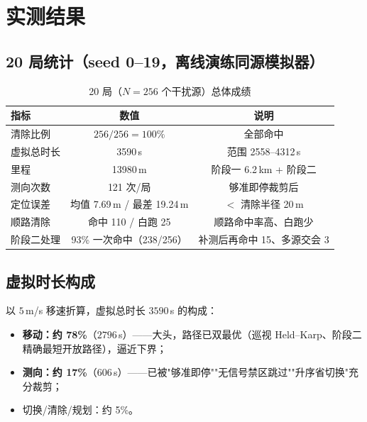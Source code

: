 \documentclass[a4paper,11pt]{ctexart}
\begin{document}
\section{实测结果}
\subsection{20 局统计（seed 0--19，离线演练同源模拟器）}
\begin{table}[H]
  \centering
  \caption{20 局（$N=256$ 个干扰源）总体成绩}
  \label{tab:main}
  \begin{tabular}{lcc}
    \toprule
    指标 & 数值 & 说明 \\
    \midrule
    清除比例 & $256/256=100\%$ & 全部命中 \\
    虚拟总时长 & 3590\,s & 范围 2558--4312\,s \\
    里程 & 13980\,m & 阶段一 6.2\,km + 阶段二 \\
    测向次数 & 121 次/局 & 够准即停裁剪后 \\
    定位误差 & 均值 7.69\,m / 最差 19.24\,m & $<$ 清除半径 20\,m \\
    顺路清除 & 命中 110 / 白跑 25 & 顺路命中率高、白跑少 \\
    阶段二处理 & 93\% 一次命中（238/256）& 补测后再命中 15、多源交会 3 \\
    \bottomrule
  \end{tabular}
\end{table}

\subsection{虚拟时长构成}
以 $5$\,m/s 移速折算，虚拟总时长 $3590$\,s 的构成：
\begin{itemize}
  \item \textbf{移动：约 78\%}（$2796$\,s）——大头，路径已双最优（巡视 Held--Karp、阶段二
        精确最短开放路径），逼近下界；
  \item \textbf{测向：约 17\%}（$606$\,s）——已被"够准即停""无信号禁区跳过""升序省切换"充分裁剪；
  \item 切换/清除/规划：约 5\%。
\end{itemize}
\end{document}
